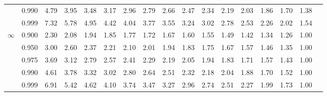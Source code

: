 \documentclass[pdftex,11pt,openany]{book}\usepackage[]{graphicx}\usepackage[]{color}
\begin{document}
{\begin{center}
\begin{tabular}{rrr@{\,}r@{\,}r@{\,}r@{\,}r@{\,}r@{\,}r@{\,}r
                   @{\,}r@{\,}r@{\,}r@{\,}r@{\,}r@{\,}r@{\,}r}
  &0.990&4.79&3.95&3.48&3.17&2.96&2.79&2.66&2.47&2.34&2.19&2.03&1.86&1.70&1.38\\
  &0.999&7.32&5.78&4.95&4.42&4.04&3.77&3.55&3.24&3.02&2.78&2.53&2.26&2.02&1.54\\
$\infty$
  &0.900&2.30&2.08&1.94&1.85&1.77&1.72&1.67&1.60&1.55&1.49&1.42&1.34&1.26&1.00\\
  &0.950&3.00&2.60&2.37&2.21&2.10&2.01&1.94&1.83&1.75&1.67&1.57&1.46&1.35&1.00\\
  &0.975&3.69&3.12&2.79&2.57&2.41&2.29&2.19&2.05&1.94&1.83&1.71&1.57&1.43&1.00\\
  &0.990&4.61&3.78&3.32&3.02&2.80&2.64&2.51&2.32&2.18&2.04&1.88&1.70&1.52&1.00\\
  &0.999&6.91&5.42&4.62&4.10&3.74&3.47&3.27&2.96&2.74&2.51&2.27&1.99&1.73&1.00
\end{tabular}
\end{center}



} %
\end{document}
